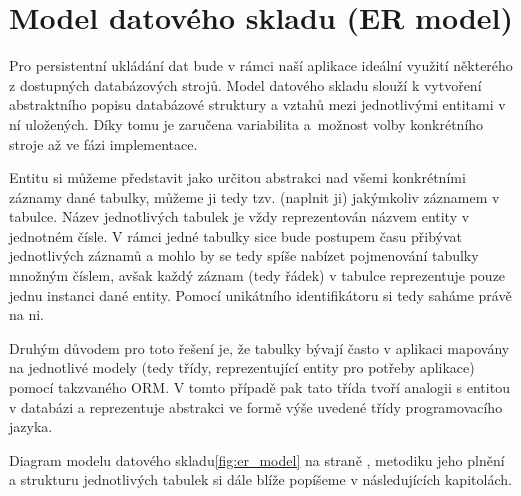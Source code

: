 \documentclass[thesis=M,czech]{FITthesis}[2012/06/26]
\begin{document}
\section{Model datového skladu (ER model)}\label{sec:er_model}
Pro persistentní ukládání dat bude v rámci naší aplikace ideální využití některého z dostupných databázových strojů. Model datového skladu slouží k vytvoření abstraktního popisu databázové struktury a vztahů mezi jednotlivými entitami v ní uložených. Díky tomu je zaručena variabilita a~možnost volby konkrétního stroje až ve fázi implementace.

Entitu si můžeme představit jako určitou abstrakci nad všemi konkrétními záznamy dané tabulky, můžeme ji tedy tzv.  (naplnit ji) jakýmkoliv záznamem v tabulce. Název jednotlivých tabulek je vždy reprezentován názvem entity v jednotném čísle. V rámci jedné tabulky sice bude postupem času přibývat jednotlivých záznamů a mohlo by se tedy spíše nabízet pojmenování tabulky množným číslem, avšak každý záznam (tedy řádek) v tabulce reprezentuje pouze jednu instanci dané entity. Pomocí unikátního identifikátoru si tedy saháme právě na ni.

Druhým důvodem pro toto řešení je, že tabulky bývají často v aplikaci mapovány na jednotlivé modely (tedy třídy, reprezentující entity pro potřeby aplikace) pomocí takzvaného ORM. V tomto případě pak tato třída tvoří analogii s entitou v databázi a reprezentuje abstrakci ve formě výše uvedené třídy programovacího jazyka.

Diagram modelu datového skladu\ref{fig:er_model} na straně \pageref{fig:er_model}, metodiku jeho plnění a strukturu jednotlivých tabulek si dále blíže popíšeme v následujících kapitolách.
\end{document}
